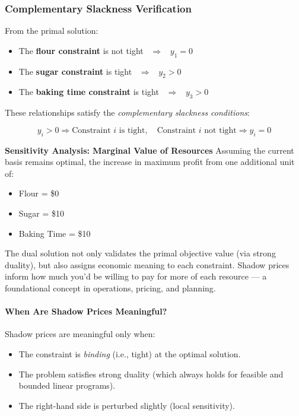 \vspace{1em}
\subsubsection*{Complementary Slackness Verification}

From the primal solution:
\begin{itemize}
\item The \textbf{flour constraint} is not tight \ $\Rightarrow$ \  $y_1 = 0$
\item The \textbf{sugar constraint} is tight \ $\Rightarrow$ \ $y_2 > 0$
\item The \textbf{baking time constraint} is tight \ $\Rightarrow$ \ $y_3 > 0$
\end{itemize}

These relationships satisfy the \emph{complementary slackness conditions}:

$$
y_i > 0 \Rightarrow \text{Constraint } i \text{ is tight}, \quad
\text{Constraint } i \text{ not tight} \Rightarrow y_i = 0
$$

\vspace{1em}
\textbf{Sensitivity Analysis: Marginal Value of Resources}
Assuming the current basis remains optimal, the increase in maximum profit from one additional unit of:
\begin{itemize}
\item Flour = \$0
\item Sugar = \$10
\item Baking Time = \$10
\end{itemize}


\vspace{1em}


The dual solution not only validates the primal objective value (via strong duality), but also assigns economic meaning to each constraint. Shadow prices inform how much you’d be willing to pay for more of each resource — a foundational concept in operations, pricing, and planning.


\paragraph{When Are Shadow Prices Meaningful?}
Shadow prices are meaningful only when:

\begin{itemize}
\item The constraint is \emph{binding} (i.e., tight) at the optimal solution.
\item The problem satisfies strong duality (which always holds for feasible and bounded linear programs).
\item The right-hand side is perturbed slightly (local sensitivity).
\end{itemize}

